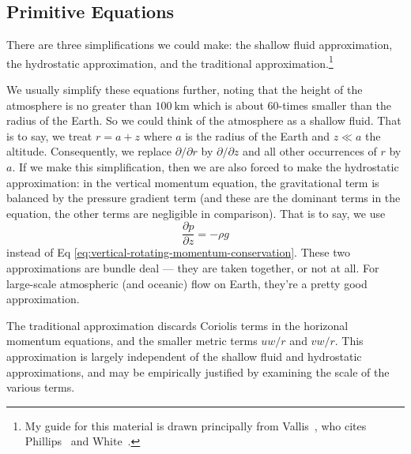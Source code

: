 \subsection{Primitive Equations}\label{subsec:intro:primitive-equations}

There are three simplifications we could make: the shallow fluid
approximation, the hydrostatic approximation, and the traditional
approximation.\footnote{My guide for this material is drawn
principally from Vallis~\cite[\S\S2.2.4--2.2.5]{vallis_2017}, who cites
Phillips~\cite{phillips1966TheEquationsofMotionforaShallowRotatingAtmosphereandtheTraditionalApproximation}
and White~\cite{white2002}.}

We usually simplify these equations further, noting that the height of
the atmosphere is no greater than $\SI{100}{\km}$ which is about
60-times smaller than the radius of the Earth. So we could think of the
atmosphere as a shallow fluid.
That is to say, we treat $r=a+z$ where
$a$ is the radius of the Earth and $z\ll a$ the altitude. Consequently,
we replace $\partial/\partial r$ by $\partial/\partial z$ and all other
occurrences of $r$ by $a$. If we make this simplification, then we
are also forced to make the hydrostatic
approximation: in the vertical
momentum equation, the gravitational term is balanced by the pressure
gradient term (and these are the dominant terms in the equation, the
other terms are negligible in comparison). That is to say, we use
\begin{equation}
  \frac{\partial p}{\partial z}=-\rho g
\end{equation}
instead of Eq \eqref{eq:vertical-rotating-momentum-conservation}. These
two approximations are bundle deal --- they are taken together, or not
at all. For large-scale atmospheric (and oceanic) flow on Earth, they're
a pretty good approximation.

The traditional approximation discards Coriolis terms in the horizonal
momentum equations, and the smaller metric terms $uw/r$ and
$vw/r$. This approximation is largely independent of the shallow fluid
and hydrostatic approximations, and may be empirically justified by
examining the scale of the various terms.

